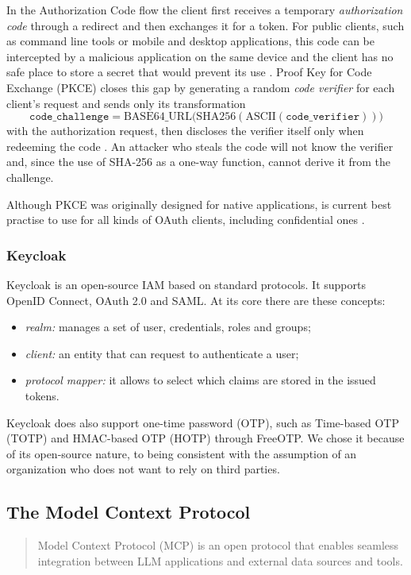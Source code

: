 In the Authorization Code flow the client first receives a temporary \textit{authorization code} through a redirect and then exchanges it for a token. For public clients, such as command line tools or mobile and desktop applications, this code can be intercepted by a malicious application on the same device and the client has no safe place to store a secret that would prevent its use \cite{rfc7636}.
Proof Key for Code Exchange (PKCE) closes this gap by generating a random \textit{code verifier} for each client's request and sends only its transformation
\begin{equation}
    \texttt{code\_challenge} = \mathrm{BASE64\_URL}\big(\mathrm{SHA256}(\mathrm{ASCII}(\texttt{code\_verifier}))\big)
\end{equation}
with the authorization request, then discloses the verifier itself only when redeeming the code \cite{rfc7636}.
An attacker who steals the code will not know the verifier and, since the use of SHA-256 as a one-way function, cannot derive it from the challenge.

Although PKCE was originally designed for native applications, is current best practise to use for all kinds of OAuth clients, including confidential ones \cite{rfc9700}.
\subsubsection{Keycloak}
Keycloak is an open-source IAM based on standard protocols. It supports OpenID Connect, OAuth 2.0 and SAML.
At its core there are these concepts:
\begin{itemize}
    \item \textit{realm:} manages a set of user, credentials, roles and groups;
    \item \textit{client:} an entity that can request to authenticate a user;
    \item \textit{protocol mapper:} it allows to select which claims are stored in the issued tokens.
\end{itemize}
Keycloak does also support one-time password (OTP), such as Time-based OTP (TOTP) and HMAC-based OTP (HOTP) through FreeOTP.
We chose it because of its open-source nature, to being consistent with the assumption of an organization who does not want to rely on third parties.
\subsection{The Model Context Protocol}
\blockcquote{mcpspec}{Model Context Protocol (MCP) is an open protocol that enables seamless integration between LLM applications and external data sources and tools.}

